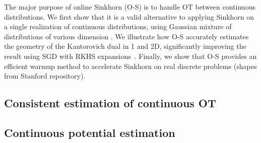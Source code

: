 The major purpose of online Sinkhorn (O-S) is to handle OT between continuous
distributions.  We first show that it is a valid alternative to applying Sinkhorn on a single realization of continuous distributions, using Gaussian mixture of distributions of various dimension
. We illustrate how O-S accurately estimates the geometry of
the Kantorovich dual in 1 and 2D, significantly improving the result using SGD with RKHS
expansions~\citep{2016-genevay-nips}. Finally, we show that O-S
provides an efficient warmup method to accelerate Sinkhorn on real discrete problems (shapes from Stanford repository).


\subsection{Consistent estimation of continuous OT}\label{sec:exp1}



\subsection{Continuous potential estimation}

